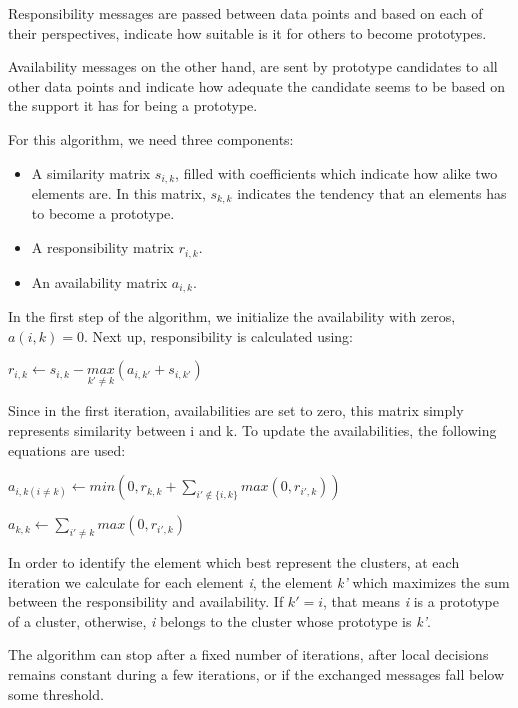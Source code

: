 Responsibility messages are passed between data points and based on each of their perspectives, indicate how suitable is it for others to become prototypes.  

Availability messages on the other hand, are sent by prototype candidates to all other data points and indicate how adequate the candidate seems to be based on the support it has for being a prototype.

For this algorithm, we need three components:
\begin{itemize}
	\item A similarity matrix $s_{i,k}$, filled with coefficients which indicate how alike two elements are. In this matrix,  $s_{k,k}$ indicates the tendency that an elements has to become a prototype. 
	\item A responsibility matrix $r_{i,k}$.
	\item An availability matrix $a_{i,k}$.
\end{itemize}  

In the first step of the algorithm, we initialize the availability with zeros, $a(i,k) = 0$. Next up, responsibility is calculated using:

\begin{center}
	$r_{i,k}\leftarrow s_{i,k} -\underset{k'\neq k}{max}(a_{i,k'} + s_{i,k'})$
\end{center}

Since in the first iteration, availabilities are set to zero, this matrix simply represents similarity between i and k. To update the availabilities, the following equations are used: 

\begin{center}
	$a_{i,k(i\neq k)}\leftarrow min\left ( 0, r_{k,k} + \sum\limits_{i'\notin \{ i,k \} }^{} max(0,r_{i',k})  \right)$	
	
	$a_{k,k} \leftarrow \sum\limits_{i'\neq k}^{ } max(0, r_{i',k})$
\end{center}

In order to identify the element which best represent the clusters, at each iteration we calculate for each element \textit{i}, the element \textit{k'} which maximizes the sum between the responsibility and availability. If $k' = i$, that means \textit{i} is a prototype of a cluster, otherwise, \textit{i} belongs to the cluster whose prototype is \textit{k'}.

The algorithm can stop after a fixed number of iterations, after local decisions remains constant during a few iterations, or if the exchanged messages fall below some threshold.

